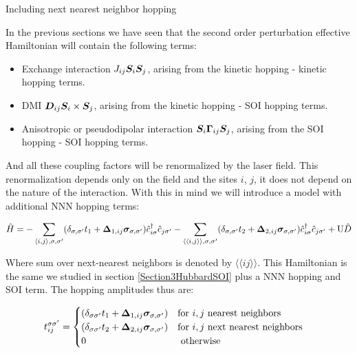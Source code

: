 \begin{section}{Including next nearest neighbor hopping}

\label{section3NNN}

In the previous sections we have seen that the second order perturbation effective Hamiltonian will contain the following terms:

\begin{itemize}
	\item Exchange interaction $J_{ij} \boldsymbol{S}_i \boldsymbol{S}_j$, arising from the kinetic hopping - kinetic hopping terms.
	\item DMI $\boldsymbol{D}_{ij} \boldsymbol{S}_i \times \boldsymbol{S}_j$, arising from the kinetic hopping - SOI hopping terms.
	\item Anisotropic or pseudodipolar interaction $\boldsymbol{S}_i \boldsymbol{\Gamma}_{ij} \boldsymbol{S}_j$, arising from the SOI hopping - SOI hopping terms.
\end{itemize}

And all these coupling factors will be renormalized by the laser field. This renormalization depends only on the field and the sites $i$, $j$, it does not depend on the nature of the interaction. With this in mind we will introduce a model with additional NNN hopping terms: 

\begin{equation}
\label{BigHam}
\hat{H} = -\sum_{\langle i,j \rangle, \sigma, \sigma'}(\delta_{\sigma, \sigma'} t_1 + \boldsymbol{\Delta}_{1,ij} \boldsymbol{\sigma}_{\sigma, \sigma'})\hat{c}_{i \sigma}^\dagger \hat{c}_{j \sigma'} - 
	\sum_{\langle \langle i,j \rangle \rangle, \sigma, \sigma'}(\delta_{\sigma, \sigma'} t_2 + \boldsymbol{\Delta}_{2,ij} \boldsymbol{\sigma}_{\sigma, \sigma'})\hat{c}_{i \sigma}^\dagger \hat{c}_{j \sigma'} + 
	\text{U}\hat{D}
\end{equation}

Where sum over next-nearest neighbors is denoted by $\langle \langle i j \rangle \rangle$. This Hamiltonian is the same we studied in section \ref{Section3HubbardSOI} plus a NNN hopping and SOI term. The hopping amplitudes thus are:

\begin{equation}
\label{BigHamHoppingAmp}
t_{ij}^{\sigma \sigma'} = \begin{cases}
	(\delta_{\sigma \sigma'}t_1+\boldsymbol{\Delta}_{1,ij} \boldsymbol{\sigma}_{\sigma, \sigma'}) & \text{for } i, j \text{ nearest neighbors} \\
	(\delta_{\sigma \sigma'}t_2+\boldsymbol{\Delta}_{2,ij} \boldsymbol{\sigma}_{\sigma, \sigma'}) & \text{for } i, j \text{ next nearest neighbors} \\
	0 & \text{ otherwise}
\end{cases} \quad
\end{equation}


\end{section}
